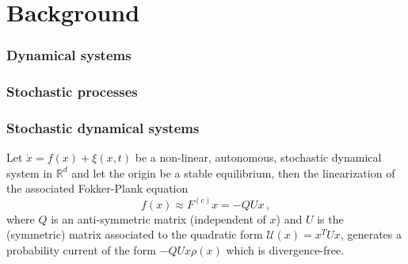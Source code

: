 \documentclass[../main.tex]{subfiles}
\begin{document}
\section{Background}\label{sec1}
     \subsubsection{Dynamical systems}\label{subsubsec1.3.1}
     \subsubsection{Stochastic processes}\label{subsubsec1.3.2}
     \subsubsection{Stochastic dynamical systems}\label{subsubsec1.3.3}
     \begin{theorem}[label=thm1]{}{}
             Let $\dot{x}=f(x) + \xi(x,t)$ be a non-linear, autonomous, stochastic dynamical system in $\mathbb{R}^{d}$ and let the origin be a stable equilibrium, then the linearization of the associated Fokker-Plank equation 
             \begin{equation*}
                  f(x)\approx F^{(c)}x=-QUx\,,
             \end{equation*}
             where $Q$ is an anti-symmetric matrix (independent of $x$) and $U$ is the (symmetric) matrix associated to the quadratic form $\mathcal{U}(x)=x^{T}Ux$, generates a probability current of the form $-QUx\rho(x)$ which is divergence-free.
     \end{theorem}
\end{document}
